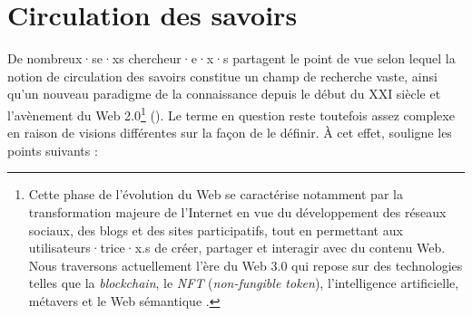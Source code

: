\label{sota}
\section{Circulation des savoirs}
De nombreux·se·xs chercheur·e·x·s partagent le point de vue selon lequel la notion de \og{}circulation des savoirs\fg{} constitue un champ de recherche vaste, ainsi qu'un nouveau paradigme de la connaissance depuis le début du XXI\ieme{} siècle et l'avènement du Web 2.0\footnote{Cette phase de l'évolution du Web se caractérise notamment par la transformation majeure de l'Internet en vue du développement des réseaux sociaux, des blogs et des sites participatifs, tout en permettant aux utilisateurs·trice·x.s de créer, partager et interagir avec du contenu Web. Nous traversons actuellement l'ère du Web 3.0 qui repose sur des technologies telles que la \textit{blockchain}, le \textit{NFT} (\textit{non-fungible token}), l'intelligence artificielle, métavers et le Web sémantique \citep{varet2023nouvelles}.}
(\citealp{landais2014frederic,quet2014frederic}). Le terme en question reste toutefois assez complexe en raison de visions différentes sur la façon de le définir. À cet effet, \citet{quet2014frederic} souligne les points suivants :
